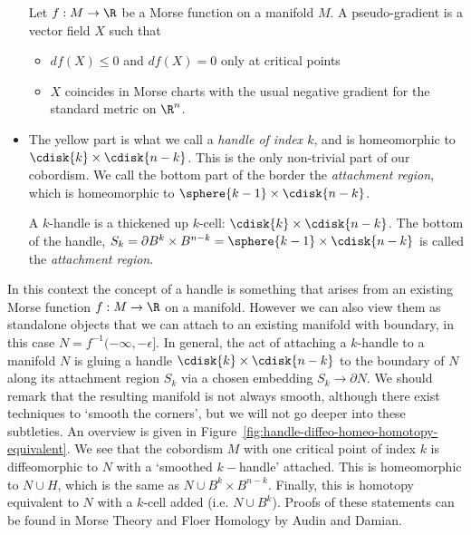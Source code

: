 \begin{itemize}
        \begin{definition}
            Let $f: M \to  \R$ be a Morse function on a manifold $M$. A pseudo-gradient is a vector field $X$ such that
            \begin{itemize}
                \item $df(X) \le 0$ and $df(X) = 0$ only at critical points
                \item $X$ coincides in Morse charts with the usual negative gradient for the standard metric on $\R^{n}$.
            \end{itemize}
        \end{definition}
    \item[\circled{H}]  The yellow part is what we call a \emph{handle of index $k$}, and is homeomorphic to $\cdisk{k} \times \cdisk{n-k}$.
        This is the only non-trivial part of our cobordism.
        We call the bottom part of the border the \emph{attachment region}, which is homeomorphic to $\sphere{k-1} \times \cdisk{n-k}$.

\begin{definition}[$k$-handle]
    A $k$-handle is a thickened up $k$-cell: $\cdisk{k} \times \cdisk{n-k}$.
    The bottom of the handle, $S_k = \partial B^{k} \times B^{n-k} = \sphere{k-1} \times \cdisk{n-k}$ is called the \emph{attachment region}.
    \end{definition}
\end{itemize}

    In this context the concept of a handle is something that arises from an existing Morse function $f:M \to  \R$ on a manifold.
    However we can also view them as standalone objects that we can attach to an existing manifold with boundary, in this case $N = f^{-1}(-\infty, -\epsilon]$.
    In general, the act of attaching a $k$-handle to a manifold $N$ is gluing a handle $\cdisk{k} \times \cdisk{n-k}$ to the boundary of $N$ along its attachment region $S_k$ via a chosen embedding $S_k \to  \partial N$.
    We should remark that the resulting manifold is not always smooth, although there exist techniques to `smooth the corners', but we will not go deeper into these subtleties.
    An overview is given in Figure~\ref{fig:handle-diffeo-homeo-homotopy-equivalent}.
    We see that the cobordism $M$ with one critical point of index $k$ is diffeomorphic to $N$ with a `smoothed $k-$handle' attached.
    This is homeomorphic to $N \cup H$, which is the same as $N \cup B^{k} \times B^{n-k}$.
    Finally, this is homotopy equivalent to $N$ with a $k$-cell added (i.e. $N \cup B^{k}$).
    Proofs of these statements can be found in Morse Theory and Floer Homology by Audin and Damian.

